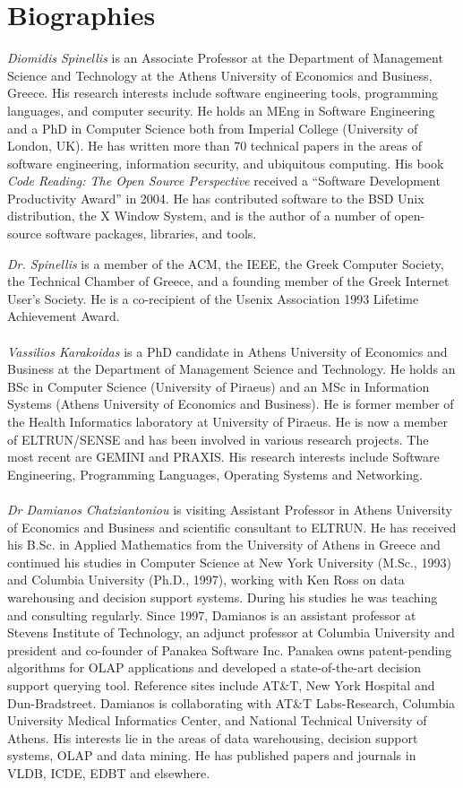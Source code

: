 \section*{Biographies}
\noindent
{\em Diomidis Spinellis} is an Associate Professor at the Department of Management Science and Technology at the Athens University of Economics and Business, 
Greece.  His research interests include software engineering tools, programming languages, and computer security.  He holds an MEng in Software Engineering 
and a PhD in Computer Science both from Imperial College (University of London, UK).  He has written more than 70  technical papers in the areas of 
software engineering, information security, and ubiquitous computing. 
His book {\em Code Reading: The Open Source Perspective}
received a ``Software Development Productivity Award'' in 2004.  He has contributed software to the BSD Unix distribution, the X Window System, 
and is the author of a number of open-source software packages, libraries, and tools.

{\em Dr. Spinellis} is a member of the ACM, the IEEE, the Greek Computer Society, the Technical Chamber of Greece, and a founding member of the Greek 
Internet User's Society.  He is a co-recipient of the Usenix Association 1993 Lifetime Achievement Award.
\\
\\
{\em Vassilios Karakoidas} is a PhD candidate in Athens University of Economics and Business at the Department of Management Science and 
Technology. He holds an BSc in Computer Science (University of Piraeus) and an MSc in Information Systems (Athens University of 
Economics and Business). He is former member of the Health Informatics laboratory at University of Piraeus. He is now a member of 
ELTRUN/SENSE and has been involved in various research projects. The most recent are GEMINI and PRAXIS. His research interests include
Software Engineering, Programming Languages, Operating Systems and Networking.
\\
\\
{\em Dr Damianos Chatziantoniou} is visiting Assistant Professor in Athens University of Economics and Business and scientific consultant to 
ELTRUN. He has received his B.Sc. in Applied Mathematics from the University of Athens in Greece and continued his studies in Computer 
Science at New York University (M.Sc., 1993) and Columbia University (Ph.D., 1997), working with Ken Ross on data warehousing and decision
support systems. During his studies he was teaching and consulting regularly. Since 1997, Damianos is an assistant professor at Stevens 
Institute of Technology, an adjunct professor at Columbia University and president and co-founder of Panakea Software Inc. Panakea owns 
patent-pending algorithms for OLAP applications and developed a state-of-the-art decision support querying tool. Reference sites include AT\&T, 
New York Hospital and Dun-Bradstreet. Damianos is collaborating with AT\&T Labs-Research, Columbia University Medical Informatics Center, and 
National Technical University of Athens. His interests lie in the areas of data warehousing, decision support systems, OLAP and data mining. 
He has published papers and journals in VLDB, ICDE, EDBT and elsewhere.


